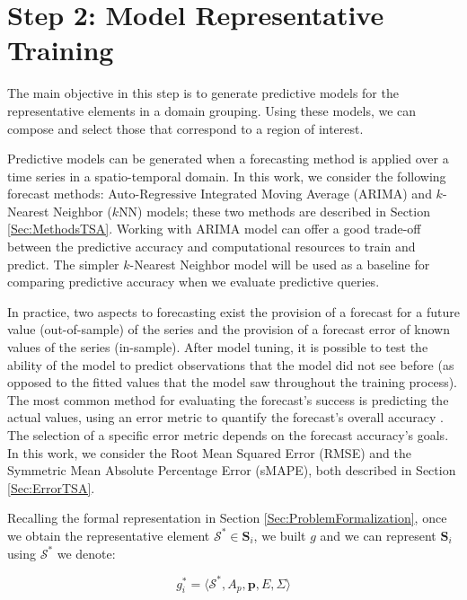 \section{Step 2: Model Representative Training}
\label{Sec:ModelRepresentatives}

The main objective in this step is to generate predictive models for the representative elements in a domain grouping. Using these models, we can compose and select those that correspond to a region of interest.

Predictive models can be generated when a forecasting method is applied over a time series in a spatio-temporal domain. In this work, we consider the following forecast methods: Auto-Regressive Integrated Moving Average (ARIMA) and $k$-Nearest Neighbor ($k$NN) models; these two methods are described in Section \ref{Sec:MethodsTSA}. Working with ARIMA model can offer a good trade-off between the predictive accuracy and computational resources to train and predict. The simpler $k$-Nearest Neighbor model will be used as a baseline for comparing predictive accuracy when we evaluate predictive queries.

In practice, two aspects to forecasting exist the provision of a forecast for a future value (out-of-sample) of the series and the provision of a forecast error of known values of the series (in-sample). After model tuning, it is possible to test the ability of the model to predict observations that the model did not see before (as opposed to the fitted values that the model saw throughout the training process). The most common method for evaluating the forecast's success is predicting the actual values, using an error metric to quantify the forecast's overall accuracy \cite{Hyndman2006}. The selection of a specific error metric depends on the forecast accuracy's goals. In this work, we consider the Root Mean Squared Error (RMSE) and the Symmetric Mean Absolute Percentage Error (sMAPE), both described in Section \ref{Sec:ErrorTSA}.

Recalling the formal representation in Section \ref{Sec:ProblemFormalization}, once we obtain the representative element $\mathcal{S}^{*} \in \mathbf{S}_{i}$, we built $g$ and we can represent $\mathbf{S}_{i}$ using $\mathcal{S}^{*}$ we denote:

\begin{equation}
g^{*}_{i} = \langle \mathcal{S}^{*}, A_p, \mathbf{p}, E, \varSigma \rangle
\end{equation}

